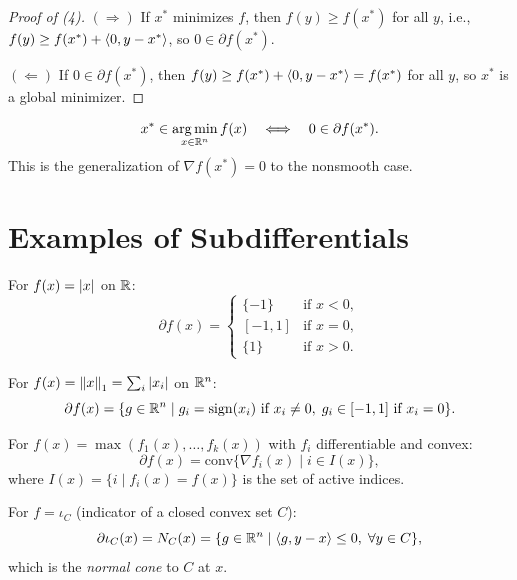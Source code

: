 \begin{proof}[Proof of (4)]
$(\Rightarrow)$ If $x^*$ minimizes $f$, then $f(y) \geq f(x^*)$ for all $y$, i.e.,
$f(y) \geq f(x^*) + \langle 0, y - x^* \rangle$, so $0 \in \partial f(x^*)$.

$(\Leftarrow)$ If $0 \in \partial f(x^*)$, then
$f(y) \geq f(x^*) + \langle 0, y-x^* \rangle = f(x^*)$ for all $y$, so $x^*$ is a global
minimizer.
\end{proof}

\begin{keyformulas}[title=\textbf{Subdifferential Optimality Condition}]
\[
    x^* \in \operatorname*{arg\,min}_{x \in \mathbb{R}^n} f(x) \quad \Longleftrightarrow \quad 0 \in \partial f(x^*).
\]
This is the generalization of $\nabla f(x^*) = 0$ to the nonsmooth case.
\end{keyformulas}

\section{Examples of Subdifferentials}

\begin{example}
For $f(x) = \left| x \right|$ on $\mathbb{R}$:
\[
    \partial f(x) = \begin{cases}
        \{-1\} & \text{if } x < 0, \\
        [-1, 1] & \text{if } x = 0, \\
        \{1\} & \text{if } x > 0.
    \end{cases}
\]
\end{example}

\begin{example}
For $f(x) = \left\| x \right\|_1 = \sum_i \left| x_i \right|$ on $\mathbb{R}^n$:
\[
    \partial f(x) = \{g \in \mathbb{R}^n \mid g_i = \mathrm{sign}(x_i) \text{ if } x_i \neq 0, \;
    g_i \in [-1,1] \text{ if } x_i = 0\}.
\]
\end{example}

\begin{example}
For $f(x) = \max(f_1(x), \ldots, f_k(x))$ with $f_i$ differentiable and convex:
\[
    \partial f(x) = \mathrm{conv}\{\nabla f_i(x) \mid i \in I(x)\},
\]
where $I(x) = \{i \mid f_i(x) = f(x)\}$ is the set of active indices.
\end{example}

\begin{example}
For $f = \iota_C$ (indicator of a closed convex set $C$):
\[
    \partial \iota_C(x) = N_C(x) = \{g \in \mathbb{R}^n \mid \langle g, y-x \rangle \leq 0, \; \forall y \in C\},
\]
which is the \emph{normal cone} to $C$ at $x$.
\end{example}

